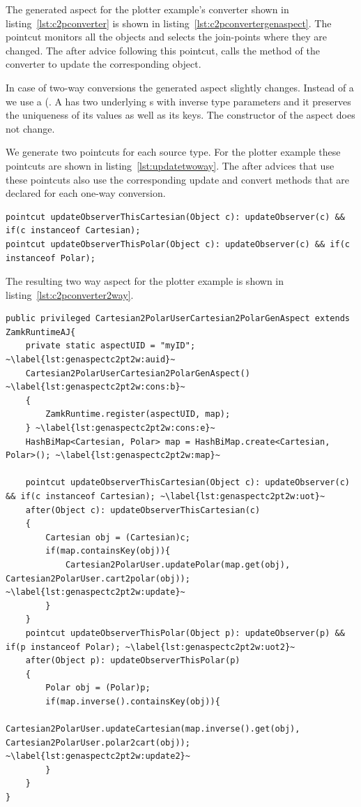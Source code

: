 The generated aspect for the plotter example's converter shown in listing~\ref{lst:c2pconverter} is shown in listing~\ref{lst:c2pconvertergenaspect}. 
The  pointcut monitors all the  objects and selects the join-points where they are changed. 
The after advice following this pointcut, calls the  method of the  converter to update the corresponding  object.

In case of two-way conversions the generated aspect slightly changes. 
Instead of a  we use a  (. 
A  has two underlying s with inverse type parameters and it preserves the uniqueness of its values as well as its keys. 
The constructor of the aspect does not change.

We generate two  pointcuts for each source type. For the plotter example these pointcuts are shown in listing~\ref{lst:updatetwoway}. The after advices that use these pointcuts also use the corresponding update and convert methods that are declared for each one-way conversion. 

\begin{lstlisting}[float, caption={\lstinln{updateObserverThis} pointcuts for two-way conversion}, label={lst:updatetwoway}]
pointcut updateObserverThisCartesian(Object c): updateObserver(c) && if(c instanceof Cartesian);
pointcut updateObserverThisPolar(Object c): updateObserver(c) && if(c instanceof Polar);
\end{lstlisting}

The resulting two way aspect for the plotter example is shown in listing~\ref{lst:c2pconverter2way}.
\begin{lstlisting}[float, caption={The aspect generated for the Cartesian to Polar two-way converter}, label={lst:c2pconverter2way}]
public privileged Cartesian2PolarUserCartesian2PolarGenAspect extends ZamkRuntimeAJ{
	private static aspectUID = "myID"; ~\label{lst:genaspectc2pt2w:auid}~
	Cartesian2PolarUserCartesian2PolarGenAspect() ~\label{lst:genaspectc2pt2w:cons:b}~
	{
		ZamkRuntime.register(aspectUID, map);
	} ~\label{lst:genaspectc2pt2w:cons:e}~
	HashBiMap<Cartesian, Polar> map = HashBiMap.create<Cartesian, Polar>(); ~\label{lst:genaspectc2pt2w:map}~
	
	pointcut updateObserverThisCartesian(Object c): updateObserver(c) && if(c instanceof Cartesian); ~\label{lst:genaspectc2pt2w:uot}~
	after(Object c): updateObserverThisCartesian(c)
	{
		Cartesian obj = (Cartesian)c;
		if(map.containsKey(obj)){
			Cartesian2PolarUser.updatePolar(map.get(obj), Cartesian2PolarUser.cart2polar(obj)); ~\label{lst:genaspectc2pt2w:update}~
		}	
	}
	pointcut updateObserverThisPolar(Object p): updateObserver(p) && if(p instanceof Polar); ~\label{lst:genaspectc2pt2w:uot2}~
	after(Object p): updateObserverThisPolar(p)
	{
		Polar obj = (Polar)p;
		if(map.inverse().containsKey(obj)){
			Cartesian2PolarUser.updateCartesian(map.inverse().get(obj), Cartesian2PolarUser.polar2cart(obj)); ~\label{lst:genaspectc2pt2w:update2}~
		}	
	}
}
\end{lstlisting}


